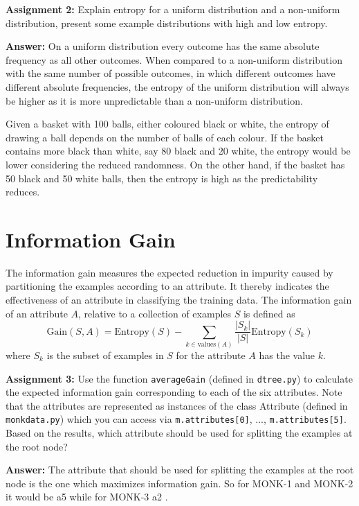 \documentclass[11pt]{article}
\begin{document}
\begin{tcolorbox}
\textbf{Assignment 2:} 
Explain entropy for a uniform distribution 
and a non-uniform distribution, present some example distributions with high and low entropy.

\textbf{Answer:} 
On a uniform distribution every outcome has the same absolute frequency as all other outcomes. When compared to a non-uniform distribution with the same number of possible outcomes, in which different outcomes have different absolute frequencies, the entropy of the uniform distribution will always be higher as it is more unpredictable than a non-uniform distribution.

Given a basket with 100 balls, either coloured black or white, the entropy of drawing a ball depends on the number of balls of each colour. If the basket contains more black than white, say 80 black and 20 white, the entropy would be lower considering the reduced randomness. On the other hand, if the basket has 50 black and 50 white balls, then the entropy is high as the predictability reduces.
\end{tcolorbox}


\section{Information Gain}

The information gain measures the expected reduction in impurity
caused by partitioning the examples according to an attribute.
It thereby indicates the effectiveness of an attribute in classifying the 
training data. The information gain of an attribute $A$, relative to 
a collection of examples $S$ is defined as
\begin{equation}
\textrm{Gain}(S,A) = \textrm{Entropy}(S) -
 \sum_{k \in \textrm{values}(A)} \frac{|S_k|}{|S|} \textrm{Entropy}(S_k)
\end{equation}
where $S_k$ is the subset of examples in $S$ for the attribute $A$ has the value $k$.


\begin{tcolorbox}
\textbf{Assignment 3:} Use the function \texttt{averageGain} (defined
in \verb!dtree.py!)  to calculate the expected information gain
corresponding to each of the six attributes.  Note that the attributes
are represented as instances of the class Attribute (defined in
\verb!monkdata.py!) which you can access via \verb!m.attributes[0]!,
..., \verb!m.attributes[5]!. Based on the results, which attribute 
should be used for splitting the examples at the root node? 

\textbf{Answer:} The attribute that should be used for splitting the examples at the root node is the one which maximizes information gain. So for MONK-1 and MONK-2 it would be a5 while for MONK-3 a2 .
\end{tcolorbox}
\end{document}
